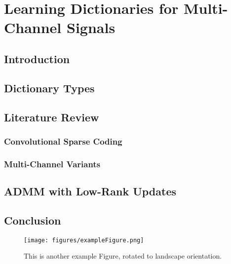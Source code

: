 \chapter{Learning Dictionaries for Multi-Channel Signals}

\section{Introduction}
\section{Dictionary Types}
\section{Literature Review}
\subsection{Convolutional Sparse Coding}
\subsection{Multi-Channel Variants}
\section{ADMM with Low-Rank Updates}
\section{Conclusion}

\begin{sidewaysfigure}
\texttt{[image: figures/exampleFigure.png]}
\caption{This is another example Figure, rotated to landscape orientation.}
\label{LandscapeFigure}
\end{sidewaysfigure}
